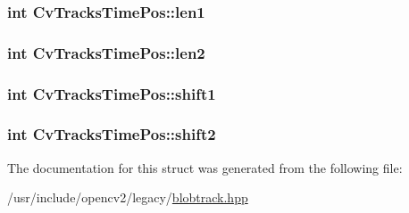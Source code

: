 \hypertarget{structCvTracksTimePos_a6ae05fd391a05a53fe785a8072f239c7}{
\subsubsection[{len1}]{\setlength{\rightskip}{0pt plus 5cm}int Cv\-Tracks\-Time\-Pos\-::len1}}\label{structCvTracksTimePos_a6ae05fd391a05a53fe785a8072f239c7}
\hypertarget{structCvTracksTimePos_a708bc6dc6fda0a94aed47036397c4682}{
\subsubsection[{len2}]{\setlength{\rightskip}{0pt plus 5cm}int Cv\-Tracks\-Time\-Pos\-::len2}}\label{structCvTracksTimePos_a708bc6dc6fda0a94aed47036397c4682}
\hypertarget{structCvTracksTimePos_a50b14244f417ba5edbd15ea9ded3f235}{
\subsubsection[{shift1}]{\setlength{\rightskip}{0pt plus 5cm}int Cv\-Tracks\-Time\-Pos\-::shift1}}\label{structCvTracksTimePos_a50b14244f417ba5edbd15ea9ded3f235}
\hypertarget{structCvTracksTimePos_a5a59ec738551f7b8f56831b972a8f65c}{
\subsubsection[{shift2}]{\setlength{\rightskip}{0pt plus 5cm}int Cv\-Tracks\-Time\-Pos\-::shift2}}\label{structCvTracksTimePos_a5a59ec738551f7b8f56831b972a8f65c}


The documentation for this struct was generated from the following file\-:\begin{DoxyCompactItemize}
\item 
/usr/include/opencv2/legacy/\hyperlink{blobtrack_8hpp}{blobtrack.\-hpp}\end{DoxyCompactItemize}
